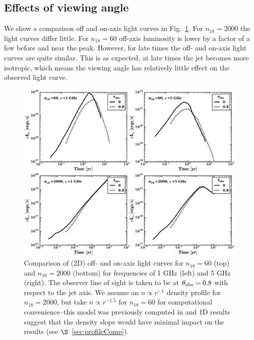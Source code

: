 \documentclass[usenatbib,fleqn]{mnras}
\begin{document}
\subsection{Effects of viewing angle}
We show a comparison off and on-axis light curves in
Fig.~\ref{fig:onOff}.  For $n_{18}=2000$ the light curves differ
little.  For $n_{18}=60$ off-axis luminosity is lower by a factor of a few
before and near the peak. However, for late times
the off- and on-axis light curves are quite similar. This is as
expected, at late times the jet becomes more isotropic, which means
the viewing angle has relatively little effect on the observed light curve.

\begin{figure}
\includegraphics[width=16cm]{on_off.pdf}
\caption{\label{fig:onOff} Comparison of (2D) off- and on-axis light
  curves for $n_{18}=60$ (top) and $n_{18}=2000$ (bottom) for
  frequencies of 1 GHz (left) and 5 GHz (right). The observer line of
  sight is taken to be at $\theta_{\rm obs}=0.8$ with respect to the
  jet axis. We assume an $n\propto r^{-1}$ density profile for
  $n_{18}=2000$, but take $n\propto r^{-1.5}$ for $n_{18}=60$ for
  computational convenience--this model was previously computed in
  \citet{Mimica+2015} and 1D results suggest that the density slope
  would have minimal impact on the results (see
  $\S$~\ref{sec:profileComp}).}
\end{figure}

\end{document}
